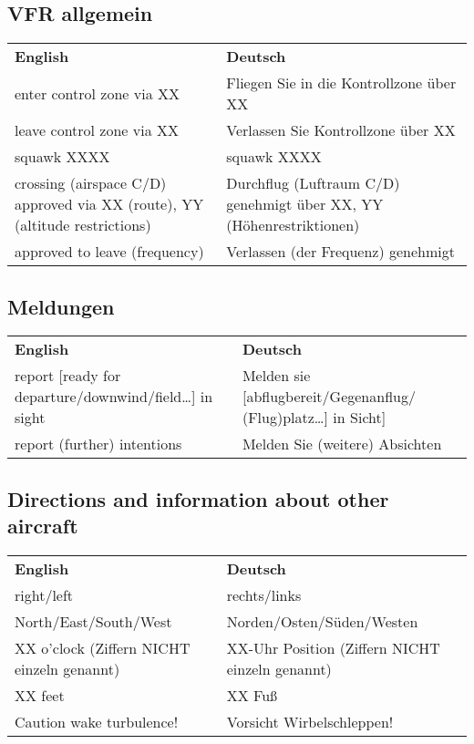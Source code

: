 
\subsection{VFR allgemein}
\begin{table}[H]
	\begin{tabularx}{\textwidth}{XX}
		\textbf{English} & \textbf{Deutsch} \\
		enter control zone via XX     & Fliegen Sie in die Kontrollzone über XX \\
		leave control zone via XX     & Verlassen Sie Kontrollzone über XX      \\
		squawk XXXX                   & squawk XXXX                             \\
		crossing (airspace C/D) approved via XX (route), YY (altitude restrictions) & Durchflug (Luftraum C/D) genehmigt über XX, YY (Höhenrestriktionen) \\
		approved to leave (frequency) & Verlassen (der Frequenz) genehmigt     
	\end{tabularx}%
\end{table}

\subsection{Meldungen}
\begin{table}[H]
	\begin{tabularx}{\textwidth}{XX}
		\textbf{English} & \textbf{Deutsch} \\
		report {[}ready for departure/downwind/field…{]} in sight & Melden sie {[}abflugbereit/Gegenanflug/ (Flug)platz…{]} in Sicht{]} \\
		report (further) intentions                               & Melden Sie (weitere) Absichten                                     
	\end{tabularx}%
\end{table}

\subsection{Directions and information about other aircraft}
\begin{table}[H]
	\begin{tabularx}{\textwidth}{XX}
		\textbf{English} & \textbf{Deutsch} \\
		right/left               & rechts/links              \\
		North/East/South/West    & Norden/Osten/Süden/Westen \\
		XX o'clock (Ziffern NICHT einzeln genannt) & XX-Uhr Position (Ziffern NICHT einzeln genannt) \\
		XX feet                  & XX Fuß                    \\
		Caution wake turbulence! & Vorsicht Wirbelschleppen!
	\end{tabularx}%
\end{table}


